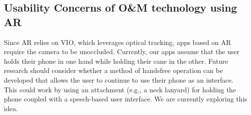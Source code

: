 \documentclass[chi_draft]{sigchi}
\newcommand{\OM}{O\&M\xspace}
\begin{document}
%
%
%
%

\subsection{Usability Concerns of \OM technology using AR}
Since AR relies on VIO, which leverages optical tracking, apps based on AR require the camera to be unoccluded.  Currently, our apps assume that the user holds their phone in one hand while holding their cane in the other.  Future research should consider whether a method of handsfree operation can be developed that allows the user to continue to use their phone as an interface.  This could work by using an attachment (e.g., a neck lanyard) for holding the phone coupled with a speech-based user interface.  We are currently exploring this idea.
\end{document}
